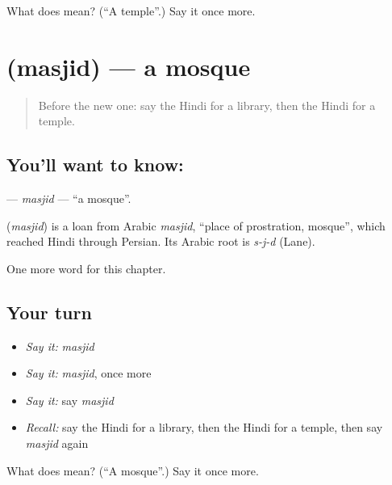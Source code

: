 \begin{tcolorbox}[breakable,colback=teal!4,colframe=teal!35!black,title={Before you move on}]
What does  mean? (\textquotedblleft{}A temple\textquotedblright{}.) Say it once more.
\end{tcolorbox}
\section[\texorpdfstring{\hi{मस्जिद} (masjid)}{मस्जिद (masjid)}]{ (masjid) — a mosque}

\label{lesson:HI-C152-masjid}



\begin{quote}
Before the new one: say the Hindi for a library, then the Hindi for a temple.
\end{quote}

\subsection*{You'll want to know: }
\textbf{} — \emph{masjid} — \textquotedblleft{}a mosque\textquotedblright{}.

\begin{cousinweb}
\textbf{} (\emph{masjid}) is a loan from Arabic \emph{masjid}, \textquotedblleft{}place of prostration, mosque\textquotedblright{}, which reached Hindi through Persian. Its Arabic root is \emph{s-j-d} (Lane).
\end{cousinweb}

\begin{grammarlens}[title={What you've built}]
One more word for this chapter.
\end{grammarlens}

\subsection*{Your turn}
\begin{itemize}
\raggedright
  \item \emph{Say it:} \emph{masjid}
  \item \emph{Say it:} \emph{masjid}, once more
  \item \emph{Say it:} say \emph{masjid}
  \item \emph{Recall:} say the Hindi for a library, then the Hindi for a temple, then say \emph{masjid} again
\end{itemize}

\begin{tcolorbox}[breakable,colback=teal!4,colframe=teal!35!black,title={Before you move on}]
What does  mean? (\textquotedblleft{}A mosque\textquotedblright{}.) Say it once more.
\end{tcolorbox}
